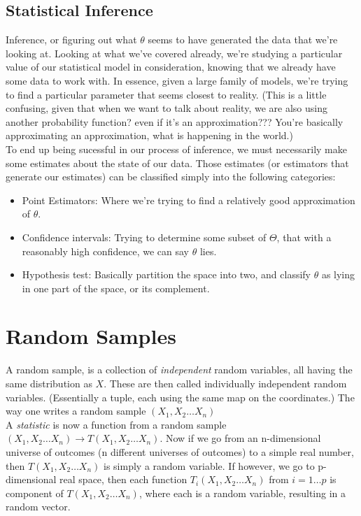 \documentclass[12pt]{book}
\theoremstyle{definition}
\begin{document}
\subsection{Statistical Inference}
Inference, or figuring out what $\theta$ seems to have generated the data that we're looking at. Looking at what we've covered already, we're studying a particular value of our statistical model in consideration, knowing that we already have some data to work with. In essence, given a large family of models, we're trying to find a particular parameter that seems closest to reality. (This is a little confusing, given that when we want to talk about reality, we are also using another probability function? even if it's an approximation??? You're basically approximating an approximation, what is happening in the world.)\\
To end up being sucessful in our process of inference, we must necessarily make some estimates about the state of our data. Those estimates (or estimators that generate our estimates) can be classified simply into the following categories:\begin{itemize}
    \item Point Estimators: Where we're trying to find a relatively good approximation of $\theta$.
    \item Confidence intervals: Trying to determine some subset of $\Theta$, that with a reasonably high confidence, we can say $\theta$ lies.
    \item Hypothesis test: Basically partition the space into two, and classify $\theta$ as lying in one part of the space, or its complement.
\end{itemize}
\section{Random Samples}
A random sample, is a collection of \textit{independent} random variables, all having the same distribution as $X$. These are then called individually independent random variables. (Essentially a tuple, each using the same map on the coordinates.) The way one writes a random sample $(X_1, X_2 \ldots X_n)$\\
A \textit{statistic} is now a function from a random sample $(X_1, X_2 \ldots X_n) \to T(X_1, X_2 \ldots X_n)$. Now if we go from an n-dimensional universe of outcomes (n different universes of outcomes) to a simple real number, then $T(X_1, X_2 \ldots X_n)$ is simply a random variable. If however, we go to p-dimensional real space, then each function $T_i(X_1, X_2 \ldots X_n)$ from $i = 1 \ldots p$ is component of $T(X_1, X_2 \ldots X_n)$, where each is a random variable, resulting in a random vector. 
\end{document}
